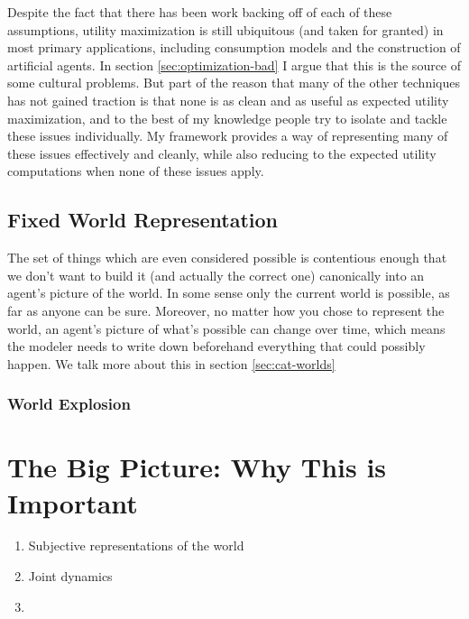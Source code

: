 \documentclass{article}
\begin{document}
	Despite the fact that there has been work backing off of each of these assumptions, utility maximization is still ubiquitous (and taken for granted) in most primary applications, including consumption models and the construction of artificial agents. In section \ref{sec:optimization-bad} I argue that this is the source of some cultural problems. But part of the reason that many of the other techniques has not gained traction is that none is as clean and as useful as expected utility maximization, and to the best of my knowledge people try to isolate and tackle these issues individually. My framework provides a way of representing many of these issues effectively and cleanly, while also reducing to the expected utility computations when none of these issues apply. 
	
	
	\subsection{Fixed World Representation}
	
	The set of things which are even considered possible is contentious enough that we don't want to build it (and actually the correct one) canonically into an agent's picture of the world. In some sense only the current world is possible, as far as anyone can be sure. Moreover, no matter how you chose to represent the world, an agent's picture of what's possible can change over time, which means the modeler needs to write down beforehand everything that could possibly happen. We talk more about this in section \ref{sec:cat-worlds}
	
	\subsubsection{World Explosion} \label{sec:world-explosion}
	
	\section{The Big Picture: Why This is Important}
	\begin{enumerate}
		\item Subjective representations of the world
		\item Joint dynamics
		\item 
	\end{enumerate}
\end{document}
